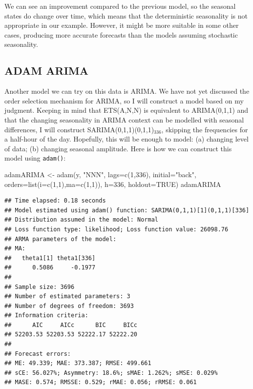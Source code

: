 \documentclass[
]{book}
\newenvironment{Shaded}{\begin{snugshade}}{\end{snugshade}}
\newcommand{\AttributeTok}[1]{\textcolor[rgb]{0.77,0.63,0.00}{#1}}
\newcommand{\ConstantTok}[1]{\textcolor[rgb]{0.00,0.00,0.00}{#1}}
\newcommand{\DecValTok}[1]{\textcolor[rgb]{0.00,0.00,0.81}{#1}}
\newcommand{\FunctionTok}[1]{\textcolor[rgb]{0.00,0.00,0.00}{#1}}
\newcommand{\NormalTok}[1]{#1}
\newcommand{\OtherTok}[1]{\textcolor[rgb]{0.56,0.35,0.01}{#1}}
\newcommand{\StringTok}[1]{\textcolor[rgb]{0.31,0.60,0.02}{#1}}
\theoremstyle{definition}
\theoremstyle{definition}
\theoremstyle{definition}
\theoremstyle{definition}
\theoremstyle{remark}
\begin{document}
We can see an improvement compared to the previous model, so the seasonal states do change over time, which means that the deterministic seasonality is not appropriate in our example. However, it might be more suitable in some other cases, producing more accurate forecasts than the models assuming stochastic seasonality.

\hypertarget{adam-arima}{%
\subsection{ADAM ARIMA}\label{adam-arima}}

Another model we can try on this data is ARIMA. We have not yet discussed the order selection mechanism for ARIMA, so I will construct a model based on my judgment. Keeping in mind that ETS(A,N,N) is equivalent to ARIMA(0,1,1) and that the changing seasonality in ARIMA context can be modelled with seasonal differences, I will construct SARIMA(0,1,1)(0,1,1)\(_{336}\), skipping the frequencies for a half-hour of the day. Hopefully, this will be enough to model: (a) changing level of data; (b) changing seasonal amplitude. Here is how we can construct this model using \texttt{adam()}:

\begin{Shaded}
\begin{Highlighting}[]
\NormalTok{adamARIMA }\OtherTok{\textless{}{-}} \FunctionTok{adam}\NormalTok{(y, }\StringTok{"NNN"}\NormalTok{, }\AttributeTok{lags=}\FunctionTok{c}\NormalTok{(}\DecValTok{1}\NormalTok{,}\DecValTok{336}\NormalTok{), }\AttributeTok{initial=}\StringTok{"back"}\NormalTok{,}
                  \AttributeTok{orders=}\FunctionTok{list}\NormalTok{(}\AttributeTok{i=}\FunctionTok{c}\NormalTok{(}\DecValTok{1}\NormalTok{,}\DecValTok{1}\NormalTok{),}\AttributeTok{ma=}\FunctionTok{c}\NormalTok{(}\DecValTok{1}\NormalTok{,}\DecValTok{1}\NormalTok{)),}
                  \AttributeTok{h=}\DecValTok{336}\NormalTok{, }\AttributeTok{holdout=}\ConstantTok{TRUE}\NormalTok{)}
\NormalTok{adamARIMA}
\end{Highlighting}
\end{Shaded}

\begin{verbatim}
## Time elapsed: 0.18 seconds
## Model estimated using adam() function: SARIMA(0,1,1)[1](0,1,1)[336]
## Distribution assumed in the model: Normal
## Loss function type: likelihood; Loss function value: 26098.76
## ARMA parameters of the model:
## MA:
##   theta1[1] theta1[336] 
##      0.5086     -0.1977 
## 
## Sample size: 3696
## Number of estimated parameters: 3
## Number of degrees of freedom: 3693
## Information criteria:
##      AIC     AICc      BIC     BICc 
## 52203.53 52203.53 52222.17 52222.20 
## 
## Forecast errors:
## ME: 49.339; MAE: 373.387; RMSE: 499.661
## sCE: 56.027%; Asymmetry: 18.6%; sMAE: 1.262%; sMSE: 0.029%
## MASE: 0.574; RMSSE: 0.529; rMAE: 0.056; rRMSE: 0.061
\end{verbatim}
\end{document}
